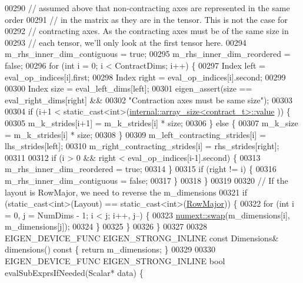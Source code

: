 \begin{DoxyCode}
00290     \textcolor{comment}{// assumed above that non-contracting axes are represented in the same order}
00291     \textcolor{comment}{// in the matrix as they are in the tensor. This is not the case for}
00292     \textcolor{comment}{// contracting axes. As the contracting axes must be of the same size in}
00293     \textcolor{comment}{// each tensor, we'll only look at the first tensor here.}
00294     m\_rhs\_inner\_dim\_contiguous = \textcolor{keyword}{true};
00295     m\_rhs\_inner\_dim\_reordered = \textcolor{keyword}{false};
00296     \textcolor{keywordflow}{for} (\textcolor{keywordtype}{int} i = 0; i < ContractDims; i++) \{
00297       Index left = eval\_op\_indices[i].first;
00298       Index right = eval\_op\_indices[i].second;
00299 
00300       Index size = eval\_left\_dims[left];
00301       eigen\_assert(size == eval\_right\_dims[right] &&
00302                    \textcolor{stringliteral}{"Contraction axes must be same size"});
00303 
00304       \textcolor{keywordflow}{if} (i+1 < static\_cast<int>(\hyperlink{struct_eigen_1_1internal_1_1array__size}{internal::array\_size<contract\_t>::value}
      )) \{
00305         m\_k\_strides[i+1] = m\_k\_strides[i] * size;
00306       \} \textcolor{keywordflow}{else} \{
00307         m\_k\_size = m\_k\_strides[i] * size;
00308       \}
00309       m\_left\_contracting\_strides[i] = lhs\_strides[left];
00310       m\_right\_contracting\_strides[i] = rhs\_strides[right];
00311 
00312       \textcolor{keywordflow}{if} (i > 0 && right < eval\_op\_indices[i-1].second) \{
00313         m\_rhs\_inner\_dim\_reordered = \textcolor{keyword}{true};
00314       \}
00315       \textcolor{keywordflow}{if} (right != i) \{
00316         m\_rhs\_inner\_dim\_contiguous = \textcolor{keyword}{false};
00317       \}
00318     \}
00319 
00320     \textcolor{comment}{// If the layout is RowMajor, we need to reverse the m\_dimensions}
00321     \textcolor{keywordflow}{if} (static\_cast<int>(Layout) == static\_cast<int>(\hyperlink{group__enums_ggaacded1a18ae58b0f554751f6cdf9eb13acfcde9cd8677c5f7caf6bd603666aae3}{RowMajor})) \{
00322       \textcolor{keywordflow}{for} (\textcolor{keywordtype}{int} i = 0, j = NumDims - 1; i < j; i++, j--) \{
00323         \hyperlink{endian_8c_a3ca5ecd34b04d6a243c054ac3a57f68d}{numext::swap}(m\_dimensions[i], m\_dimensions[j]);
00324       \}
00325     \}
00326   \}
00327 
00328   EIGEN\_DEVICE\_FUNC EIGEN\_STRONG\_INLINE \textcolor{keyword}{const} Dimensions& dimensions()\textcolor{keyword}{ const }\{ \textcolor{keywordflow}{return} m\_dimensions; \}
00329 
00330   EIGEN\_DEVICE\_FUNC EIGEN\_STRONG\_INLINE \textcolor{keywordtype}{bool} evalSubExprsIfNeeded(Scalar* data) \{

\end{DoxyCode}
